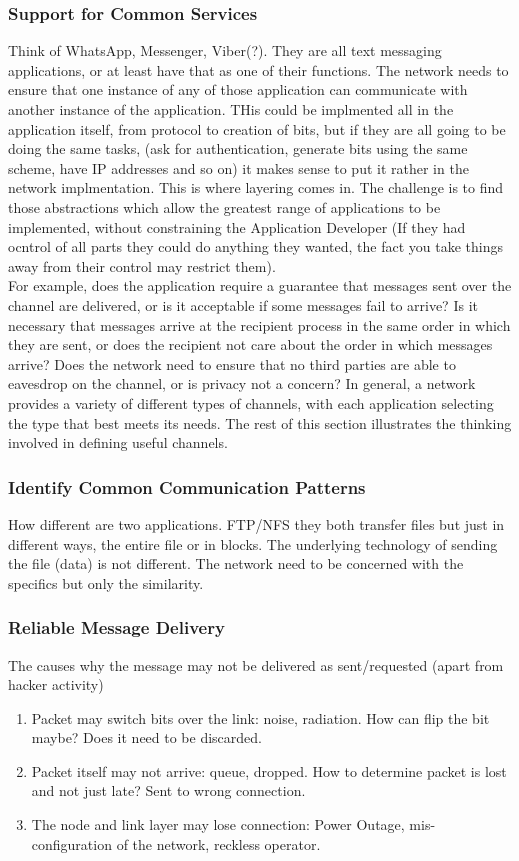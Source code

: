 \documentclass[11pt, a4paper]{article}
\begin{document}
\subsubsection{Support for Common Services}
Think of WhatsApp, Messenger, Viber(?). They are all text messaging applications, or at least have that as one of their functions. The network needs to ensure that one instance of any of those application can communicate with another instance of the application. THis could be implmented all in the application itself, from protocol to creation of bits, but if they are all going to be doing the same tasks, (ask for authentication, generate bits using the same scheme, have IP addresses and so on) it makes sense to put it rather in the network implmentation. This is where layering comes in. The challenge is to find those abstractions which allow the greatest range of applications to be implemented, without constraining the Application Developer (If they had ocntrol of all parts they could do anything they wanted, the fact you take things away from their control may restrict them).\\
For example, does the application require a guarantee that messages sent over the channel are delivered, or is it acceptable if some messages fail to arrive? Is it necessary that messages arrive at the recipient process in the same order in which they are sent, or does the recipient not care about the order in which messages arrive? Does the network need to ensure that no third parties are able to eavesdrop on the channel, or is privacy not a concern? In general, a network provides a variety of different types of channels, with each application selecting the type that best meets its needs. The rest of this section illustrates the thinking involved in defining useful channels.

\subsubsection{Identify Common Communication Patterns}
How different are two applications. FTP/NFS they both transfer files but just in different ways, the entire file or in blocks. The underlying technology of sending the file (data) is not different. The network need to be concerned with the specifics but only the similarity.

\subsubsection{Reliable Message Delivery}
The causes why the message may not be delivered as sent/requested (apart from hacker activity)
\begin{enumerate}
    \item Packet may switch bits over the link: noise, radiation. How can flip the bit maybe? Does it need to be discarded.
    \item Packet itself may not arrive: queue, dropped. How to determine packet is lost and not just late? Sent to wrong connection.
    \item The node and link layer may lose connection: Power Outage, mis-configuration of the network, reckless operator.
\end{enumerate}
\end{document}

